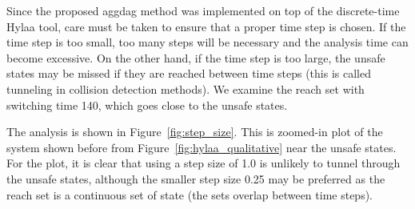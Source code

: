 Since the proposed aggdag method was implemented on top of the discrete-time Hylaa tool, care must be taken to ensure that a proper time step is chosen.
%
If the time step is too small, too many steps will be necessary and the analysis time can become excessive.
%
On the other hand, if the time step is too large, the unsafe states may be missed if they are reached between time steps
(this is called tunneling in collision detection methods).
%
We examine the reach set with switching time 140, which goes close to the unsafe states.

The analysis is shown in Figure~\ref{fig:step_size}.
%
This is zoomed-in plot of the system shown before from Figure~\ref{fig:hylaa_qualitative} near the unsafe states.
%
For the plot, it is clear that using a step size of 1.0 is unlikely to tunnel through the unsafe states,
although the smaller step size 0.25 may be preferred as the
reach set is a continuous set of state (the sets overlap between time steps).

